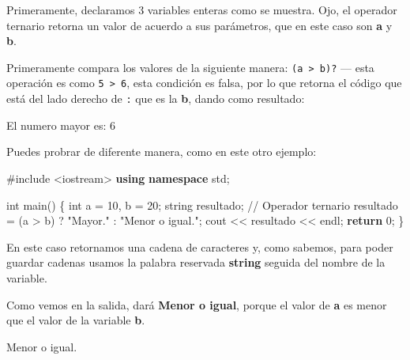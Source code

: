 \documentclass[
  11pt,
  a4paper,
  DIV=11,
  numbers=noendperiod]{scrreprt}
\newenvironment{Shaded}{\begin{snugshade}}{\end{snugshade}}
\newcommand{\CommentTok}[1]{\textcolor[rgb]{0.37,0.37,0.37}{#1}}
\newcommand{\ControlFlowTok}[1]{\textcolor[rgb]{0.00,0.23,0.31}{\textbf{#1}}}
\newcommand{\DataTypeTok}[1]{\textcolor[rgb]{0.68,0.00,0.00}{#1}}
\newcommand{\DecValTok}[1]{\textcolor[rgb]{0.68,0.00,0.00}{#1}}
\newcommand{\ImportTok}[1]{\textcolor[rgb]{0.00,0.46,0.62}{#1}}
\newcommand{\KeywordTok}[1]{\textcolor[rgb]{0.00,0.23,0.31}{\textbf{#1}}}
\newcommand{\NormalTok}[1]{\textcolor[rgb]{0.00,0.23,0.31}{#1}}
\newcommand{\OperatorTok}[1]{\textcolor[rgb]{0.37,0.37,0.37}{#1}}
\newcommand{\PreprocessorTok}[1]{\textcolor[rgb]{0.68,0.00,0.00}{#1}}
\newcommand{\StringTok}[1]{\textcolor[rgb]{0.13,0.47,0.30}{#1}}
\begin{document}
Primeramente, declaramos 3 variables enteras como se muestra. Ojo, el
operador ternario retorna un valor de acuerdo a sus parámetros, que en
este caso son \textbf{a} y \textbf{b}.

Primeramente compara los valores de la siguiente manera:
\texttt{(a\ \textgreater{}\ b)?} --- esta operación es como
\texttt{5\ \textgreater{}\ 6}, esta condición es falsa, por lo que
retorna el código que está del lado derecho de \texttt{:} que es la
\textbf{b}, dando como resultado:

\begin{tcolorbox}[custombox]
El numero mayor es: 6
\end{tcolorbox}

Puedes probrar de diferente manera, como en este otro ejemplo:

\begin{Shaded}
\begin{Highlighting}[]
\PreprocessorTok{\#include }\ImportTok{\textless{}iostream\textgreater{}}
\KeywordTok{using} \KeywordTok{namespace}\NormalTok{ std}\OperatorTok{;}

\DataTypeTok{int}\NormalTok{ main}\OperatorTok{()} \OperatorTok{\{}
    \DataTypeTok{int}\NormalTok{ a }\OperatorTok{=} \DecValTok{10}\OperatorTok{,}\NormalTok{ b }\OperatorTok{=} \DecValTok{20}\OperatorTok{;}
\NormalTok{    string resultado}\OperatorTok{;}
    \CommentTok{// Operador ternario}
\NormalTok{    resultado }\OperatorTok{=} \OperatorTok{(}\NormalTok{a }\OperatorTok{\textgreater{}}\NormalTok{ b}\OperatorTok{)} \OperatorTok{?} \StringTok{"Mayor."} \OperatorTok{:} \StringTok{"Menor o igual."}\OperatorTok{;}
\NormalTok{    cout }\OperatorTok{\textless{}\textless{}}\NormalTok{ resultado }\OperatorTok{\textless{}\textless{}}\NormalTok{ endl}\OperatorTok{;}
    \ControlFlowTok{return} \DecValTok{0}\OperatorTok{;}
\OperatorTok{\}}
\end{Highlighting}
\end{Shaded}

En este caso retornamos una cadena de caracteres y, como sabemos, para
poder guardar cadenas usamos la palabra reservada \textbf{string}
seguida del nombre de la variable.

Como vemos en la salida, dará \textbf{Menor o igual}, porque el valor de
\textbf{a} es menor que el valor de la variable \textbf{b}.

\begin{tcolorbox}[custombox]
Menor o igual.
\end{tcolorbox}
\end{document}
